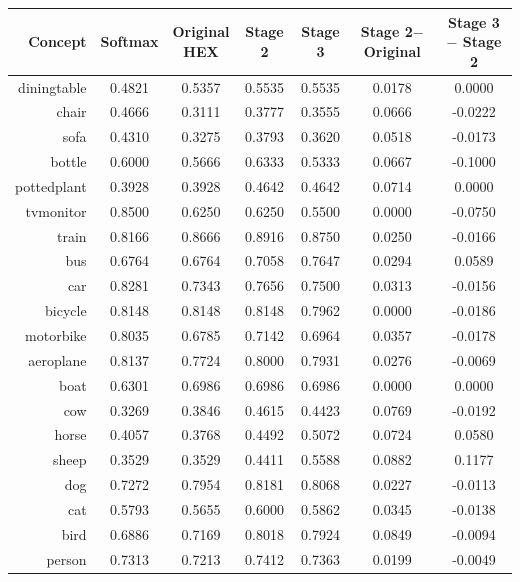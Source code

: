 \documentclass[11pt,a4paper]{book}
\begin{document}
\begin{table}[htbp]
\centering
\begin{tabular}{r|c|c|c|c|c|c}
Concept & Softmax & \makecell{Original\\HEX} & Stage 2 & Stage 3 & \makecell{Stage 2$-$\\Original} & \makecell{Stage 3$-$\\Stage 2}\\\hline
diningtable   & 0.4821 & 0.5357 & 0.5535 & 0.5535 & 0.0178 & 0.0000\\
chair         & 0.4666 & 0.3111 & 0.3777 & 0.3555 & 0.0666 & -0.0222\\
sofa          & 0.4310 & 0.3275 & 0.3793 & 0.3620 & 0.0518 & -0.0173\\
bottle        & 0.6000 & 0.5666 & 0.6333 & 0.5333 & 0.0667 & -0.1000\\
pottedplant   & 0.3928 & 0.3928 & 0.4642 & 0.4642 & 0.0714 & 0.0000\\
tvmonitor     & 0.8500 & 0.6250 & 0.6250 & 0.5500 & 0.0000 & -0.0750\\
train         & 0.8166 & 0.8666 & 0.8916 & 0.8750 & 0.0250 & -0.0166\\
bus           & 0.6764 & 0.6764 & 0.7058 & 0.7647 & 0.0294 & 0.0589\\
car           & 0.8281 & 0.7343 & 0.7656 & 0.7500 & 0.0313 & -0.0156\\
bicycle       & 0.8148 & 0.8148 & 0.8148 & 0.7962 & 0.0000 & -0.0186\\
motorbike     & 0.8035 & 0.6785 & 0.7142 & 0.6964 & 0.0357 & -0.0178\\
aeroplane     & 0.8137 & 0.7724 & 0.8000 & 0.7931 & 0.0276 & -0.0069\\
boat          & 0.6301 & 0.6986 & 0.6986 & 0.6986 & 0.0000 & 0.0000\\
cow           & 0.3269 & 0.3846 & 0.4615 & 0.4423 & 0.0769 & -0.0192\\
horse         & 0.4057 & 0.3768 & 0.4492 & 0.5072 & 0.0724 & 0.0580\\
sheep         & 0.3529 & 0.3529 & 0.4411 & 0.5588 & 0.0882 & 0.1177\\
dog           & 0.7272 & 0.7954 & 0.8181 & 0.8068 & 0.0227 & -0.0113\\
cat           & 0.5793 & 0.5655 & 0.6000 & 0.5862 & 0.0345 & -0.0138\\
bird          & 0.6886 & 0.7169 & 0.8018 & 0.7924 & 0.0849 & -0.0094\\
person        & 0.7313 & 0.7213 & 0.7412 & 0.7363 & 0.0199 & -0.0049\\\hline

\end{tabular}
\end{table}
\end{document}
